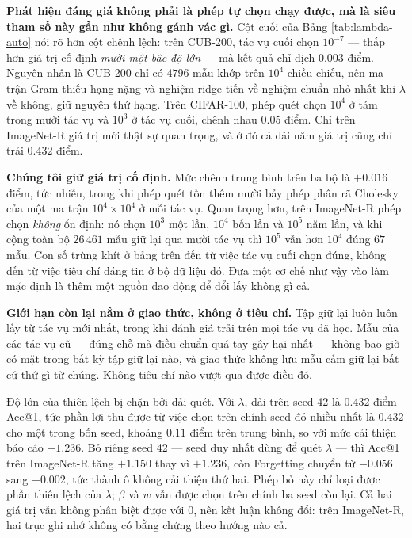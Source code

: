 \documentclass[11pt,a4paper]{article}
\begin{document}
\textbf{Phát hiện đáng giá không phải là phép tự chọn chạy được, mà là siêu tham
số này gần như không gánh vác gì.} Cột cuối của Bảng \ref{tab:lambda-auto} nói rõ
hơn cột chênh lệch: trên CUB-200, tác vụ cuối chọn $10^{-7}$ --- thấp hơn giá trị
cố định \emph{mười một bậc độ lớn} --- mà kết quả chỉ dịch $0.003$ điểm. Nguyên
nhân là CUB-200 chỉ có $4796$ mẫu khớp trên $10^4$ chiều chiếu, nên ma trận Gram
thiếu hạng nặng và nghiệm ridge tiến về nghiệm chuẩn nhỏ nhất khi $\lambda$ về
không, giữ nguyên thứ hạng. Trên CIFAR-100, phép quét chọn $10^4$ ở tám trong
mười tác vụ và $10^3$ ở tác vụ cuối, chênh nhau $0.05$ điểm. Chỉ trên ImageNet-R
giá trị mới thật sự quan trọng, và ở đó cả dải năm giá trị cũng chỉ trải $0.432$
điểm.

\textbf{Chúng tôi giữ giá trị cố định.} Mức chênh trung bình trên ba bộ là
$+0.016$ điểm, tức nhiễu, trong khi phép quét tốn thêm mười bảy phép phân rã
Cholesky của một ma trận $10^4 \times 10^4$ ở mỗi tác vụ. Quan trọng hơn, trên
ImageNet-R phép chọn \emph{không} ổn định: nó chọn $10^3$ một lần, $10^4$ bốn
lần và $10^5$ năm lần, và khi cộng toàn bộ $26\,461$ mẫu giữ lại qua mười tác vụ
thì $10^5$ vẫn hơn $10^4$ đúng $67$ mẫu. Con số trùng khít ở bảng trên đến từ
việc tác vụ cuối chọn đúng, không đến từ việc tiêu chí đáng tin ở bộ dữ liệu đó.
Đưa một cơ chế như vậy vào làm mặc định là thêm một nguồn dao động để đổi lấy
không gì cả.

\textbf{Giới hạn còn lại nằm ở giao thức, không ở tiêu chí.} Tập giữ lại luôn
luôn lấy từ tác vụ mới nhất, trong khi đánh giá trải trên mọi tác vụ đã học. Mẫu
của các tác vụ cũ --- đúng chỗ mà điều chuẩn quá tay gây hại nhất --- không bao
giờ có mặt trong bất kỳ tập giữ lại nào, và giao thức không lưu mẫu cấm giữ lại
bất cứ thứ gì từ chúng. Không tiêu chí nào vượt qua được điều đó.

Độ lớn của thiên lệch bị chặn bởi dải quét. Với $\lambda$, dải trên seed 42 là
$0.432$ điểm Acc@1, tức phần lợi thu được từ việc chọn trên chính seed đó nhiều
nhất là $0.432$ cho một trong bốn seed, khoảng $0.11$ điểm trên trung bình, so
với mức cải thiện báo cáo $+1.236$. Bỏ riêng seed 42 --- seed duy nhất dùng để
quét $\lambda$ --- thì Acc@1 trên ImageNet-R tăng $+1.150$ thay vì $+1.236$, còn
Forgetting chuyển từ $-0.056$ sang $+0.002$, tức thành ô không cải thiện thứ
hai. Phép bỏ này chỉ loại được phần thiên lệch của $\lambda$; $\beta$ và $w$ vẫn
được chọn trên chính ba seed còn lại. Cả hai giá trị vẫn không phân biệt được
với $0$, nên kết luận không đổi: trên ImageNet-R, hai trục ghi nhớ không có bằng
chứng theo hướng nào cả.
\end{document}
